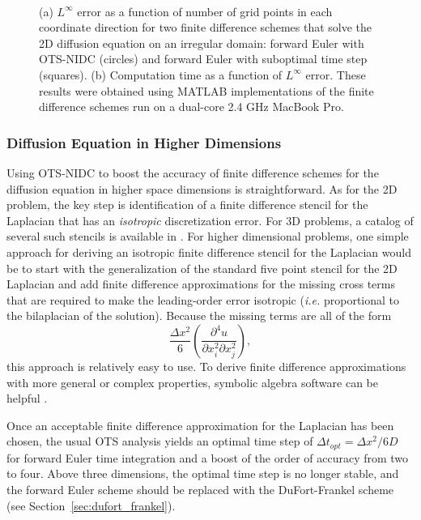 \documentclass[fleqn,12pt,twoside]{article}
\newcommand{\beq}{\begin{equation}}
\newcommand{\eeq}{\end{equation}}
\def\dt{\Delta t}
\def\dx{\Delta x}
\def\ie{\emph{i.e. }}
\begin{document}
\begin{figure}[tb]
\begin{center}
\ \ \ \ \ \ \ 
\caption{(a) $L^\infty$ error as a function of number of grid points in each
coordinate direction for two finite difference schemes that solve the 2D 
diffusion equation on an irregular domain: forward Euler with OTS-NIDC 
(circles) and forward Euler with suboptimal time step (squares).  
(b) Computation time as a function of $L^\infty$ error.  These results were
obtained using MATLAB implementations of the finite difference schemes run on
a dual-core 2.4 GHz MacBook Pro.
}
\end{center}
\end{figure}


\subsubsection{Diffusion Equation in Higher Dimensions}
Using OTS-NIDC to boost the accuracy of finite difference
schemes for the diffusion equation in higher space dimensions is 
straightforward.  As for the 2D problem, the key step is identification of a 
finite difference stencil for the Laplacian that has an \emph{isotropic} 
discretization error.  For 3D problems, a catalog of several such stencils is 
available in \cite{patra_2005}.   For higher dimensional problems, one simple
approach for deriving an isotropic finite difference stencil for the Laplacian
would be to start with the generalization of the standard five point stencil
for the 2D Laplacian and add finite difference approximations for the missing 
cross terms that are required to make the leading-order error isotropic 
(\ie proportional to the bilaplacian of the solution).  Because the missing 
terms are all of the form 
\beq
\frac{\dx^2}{6} \left(\frac{\partial^4 u}{\partial x_i^2 \partial x_j^2}\right),
\eeq
this approach is relatively easy to use.  To derive finite difference 
approximations with more general or complex properties, symbolic algebra 
software can be helpful \cite{patra_2005,gupta_1998}.  

Once an acceptable finite difference approximation for the Laplacian has been 
chosen, the usual OTS analysis yields an optimal time step of 
$\dt_{opt} = \dx^2/6D$ for forward Euler time integration and a boost of the 
order of accuracy from two to four.  Above three dimensions, the optimal
time step is no longer stable, and the forward Euler scheme should be replaced
with the DuFort-Frankel scheme (see Section~\ref{sec:dufort_frankel}).
\end{document}
